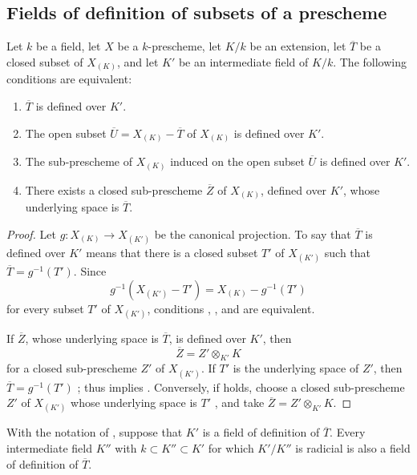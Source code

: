 \subsection{Fields of definition of subsets of a prescheme}
\label{subsection:IV.4.9}

\begin{proposition}[4.9.1]
\label{IV.4.9.1}
Let $k$ be a field, let $X$ be a $k$-prescheme, let $K/k$ be an
extension, let $\overline T$ be a closed subset of $X_{(K)}$, and let
$K'$ be an intermediate field of $K/k$.
The following conditions are equivalent:
\begin{enumerate}
\item[\rm(a)]
\label{IV.4.9.1.a}
$\overline T$ is defined over $K'$.
\item[\rm(b)]
\label{IV.4.9.1.b}
The open subset $\overline U=X_{(K)}-\overline T$ of $X_{(K)}$ is
defined over $K'$.
\item[\rm(b$'$)]
\label{IV.4.9.1.bprime}
The sub-prescheme of $X_{(K)}$ induced on the open subset
$\overline U$ is defined over $K'$.
\item[\rm(c)]
\label{IV.4.9.1.c}
There exists a closed sub-prescheme $\overline Z$ of $X_{(K)}$,
defined over $K'$, whose underlying space is $\overline T$.
\end{enumerate}
\end{proposition}

\begin{proof}
Let $g:X_{(K)}\to X_{(K')}$ be the canonical projection.
To say that $\overline T$ is defined over $K'$ means that there is a
closed subset $T'$ of $X_{(K')}$ such that
$\overline T=g^{-1}(T')$.
Since
\[
g^{-1}(X_{(K')}-T')=X_{(K)}-g^{-1}(T')
\]
for every subset $T'$ of $X_{(K')}$, conditions
, , and
 are equivalent.

If $\overline Z$, whose underlying space is $\overline T$, is defined
over $K'$, then
\[
\overline Z=Z'\otimes_{K'}K
\]
for a closed sub-prescheme $Z'$ of $X_{(K')}$.
If $T'$ is the underlying space of $Z'$, then
$\overline T=g^{-1}(T')$ ; thus
 implies .
Conversely, if  holds, choose a closed sub-prescheme
$Z'$ of $X_{(K')}$ whose underlying space is $T'$
, and take
$\overline Z=Z'\otimes_{K'}K$.
\end{proof}

\begin{corollary}[4.9.2]
\label{IV.4.9.2}
With the notation of , suppose that $K'$ is a field
of definition of $\overline T$.
Every intermediate field $K''$ with $k\subset K''\subset K'$ for
which $K'/K''$ is radicial is also a field of definition of
$\overline T$.
\end{corollary}

